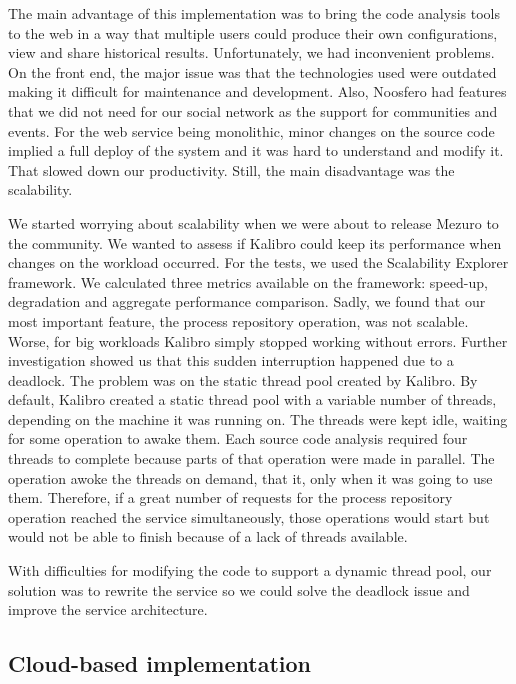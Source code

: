 The main advantage of this implementation was to bring the code analysis tools to the web in a way that multiple users could produce their own configurations, view and share historical results. Unfortunately, we had inconvenient problems. On the front end, the major issue was that the technologies used were outdated making it difficult for maintenance and development. Also, Noosfero had features that we did not need for our social network as the support for communities and events. For the web service being monolithic, minor changes on the source code implied a full deploy of the system and it was hard to understand and modify it. That slowed down our productivity. Still, the main disadvantage was the scalability.

We started worrying about scalability when we were about to release Mezuro to the community. We wanted to assess if Kalibro could keep its performance when changes on the workload occurred. For the tests, we used the Scalability Explorer\cite{moura2013automated} framework. We calculated three metrics available on the framework: speed-up, degradation and aggregate performance comparison\cite{li2012catalogue}. Sadly, we found that our most important feature, the process repository operation, was not scalable. Worse, for big workloads Kalibro simply stopped working without errors. Further investigation showed us that this sudden interruption happened due to a deadlock. The problem was on the static thread pool created by Kalibro. By default, Kalibro created a static thread pool with a variable number of threads, depending on the machine it was running on. The threads were kept idle, waiting for some operation to awake them. Each source code analysis required four threads to complete because parts of that operation were made in parallel. The operation awoke the threads on demand, that it, only when it was going to use them. Therefore, if a great number of requests for the process repository operation reached the service simultaneously, those operations would start but would not be able to finish because of a lack of threads available.

With difficulties for modifying the code to support a dynamic thread pool, our solution was to rewrite the service so we could solve the deadlock issue and improve the service architecture.

\subsection{Cloud-based implementation}
\label{subsec:cloud-based-implementation}

